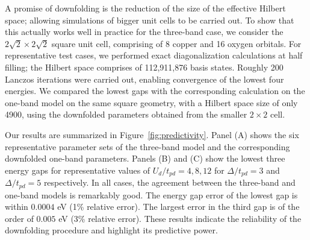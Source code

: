 A promise of downfolding is the reduction of the size of the effective Hilbert space; allowing 
simulations of bigger unit cells to be carried out. To show that this actually works well in practice for the three-band case, 
we consider the $2\sqrt{2} \times 2 \sqrt{2}$ square unit cell, comprising of 8 copper and 16 oxygen orbitals. 
For representative test cases, we performed exact diagonalization calculations at half filling; 
the Hilbert space comprises of 112,911,876 basis states. Roughly 200 Lanczos iterations were carried out, 
enabling convergence of the lowest four energies. We compared the lowest gaps with the 
corresponding calculation on the one-band model on the same square geometry, with a Hilbert space size of only 4900, 
using the downfolded parameters obtained from the smaller $2 \times 2$ cell. 

Our results are summarized in Figure~\ref{fig:predictivity}. Panel (A) shows the six representative parameter sets 
of the three-band model and the corresponding downfolded one-band parameters. Panels (B) and (C) show the lowest three energy 
gaps for representative values of $U_d/t_{pd}=4,8,12$ for $\Delta/t_{pd}=3$ and $\Delta/t_{pd}=5$ respectively. 
In all cases, the agreement between the three-band and one-band models is remarkably good. The 
energy gap error of the lowest gap is within $0.0004$ eV (1\% relative error). The largest error in the third gap is 
of the order of $0.005$ eV (3\% relative error). 
These results indicate the reliability of the downfolding procedure 
and highlight its predictive power. 


